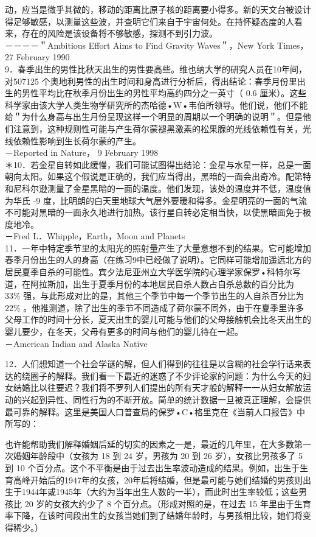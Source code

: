 动，应当是微乎其微的，移动的距离比原子核的距离要小得多。新的天文台被设计得足够敏感，以测量这些波，并查明它们来自于宇宙何处。在持怀疑态度的人看来，存在的风险是该设备将不够敏感，探测不到引力波。\\
－－－－＂Ambitious Effort Aims to Find Gravity Waves＂，New York Times， 27 February 1990\\
9．春季出生的男性比秋天出生的男性要高些。维也纳大学的研究人员在10年间，对507125 个奥地利男性的出生时间和身高进行分析后，得出结论：春季月份里出生的男性平均比在秋季月份出生的男性平均高约四分之一英寸（ 0.6 厘米）。这些科学家由该大学人类生物学研究所的杰哈德•W•韦伯所领导。他们说，他们不能给＂为什么身高与出生月份呈现这样一个明显的周期以一个明确的说明＂。但是他们注意到，这种规则性可能与产生荷尔蒙褪黑激素的松果腺的光线依赖性有关，光线依赖性影响到生长荷尔蒙的产生。\\
－Reported in Nature， 9 February 1998\\
＊10．若金星自转如此缓慢，我们可能试图得出结论：金星与水星一样，总是一面朝向太阳。如果这个假说是正确的，我们应当得出，黑暗的一面会出奇冷。配第特和尼科尔逊测量了金星黑暗的一面的温度。他们发现，该处的温度并不低，温度值为华氏 -9 度，比明朗的白天里地球大气层外要暖和得多。金星明亮的一面的气流不可能对黑暗的一面永久地进行加热。该行星自转必定相当快，以使黑暗面免于极度地冷。\\
－Fred L．Whipple，Earth，Moon and Planets\\
11．一年中特定季节里的太阳光的照射量产生了大量意想不到的结果。它可能增加春季月份出生的人的身高（在练习9中已经做了说明）。它同样可能增加遥远北方的居民夏季自杀的可能性。宾夕法尼亚州立大学医学院的心理学家保罗•科特尔写道，在阿拉斯加，出生于夏季月份的本地居民自杀人数占自杀总数的百分比为 $33 \%$ 强，与此形成对比的是，其他三个季节中每一个季节出生的人自杀百分比为 $22 \%$ 。他推测道，除了出生的季节不同造成了荷尔蒙不同外，由于在夏季里许多父母工作的时间十分长，夏天出生的婴儿可能与他们的父母接触机会比冬天出生的婴儿要少，在冬天，父母有更多的时间与他们的婴儿待在一起。\\
－American Indian and Alaska Native

12．人们想知道一个社会学谜的解，但人们得到的往往是以含糊的社会学行话来表达的绕圈子的解释。我们看一下最近的迷惑了不少评论家的问题：为什么今天的妇女结婚比以往要迟？我们将不罗列人们提出的所有天才般的解释一一从妇女解放运动的兴起到异性、同性行为的不断开放。简单的统计数据一旦被真正理解，会提供最可靠的解释。这里是美国人口普查局的保罗•C•格里克在《当前人口报告》中所写的：

\begin{displayquote}
也许能帮助我们解释婚姻后延的切实的因素之一是，最近的几年里，在大多数第一次婚姻年龄段中（女孩为 18 到 24 岁，男孩为 20 到 26 岁），女孩比男孩多了 5 到 10 个百分点。这个不平衡是由于过去出生率波动造成的结果。例如，出生于生育高峰开始后的1947年的女孩，20年后将结婚，但是最可能与她们结婚的男孩则出生于1944年或1945年（大约为当年出生人数的一半），而此时出生率较低；这些男孩比 20 岁的女孩大约少了 8 个百分点。（形成对照的是，在过去 15 年里由于生育率下降，在该时间段出生的女孩当她们到了结婚年龄时，与男孩相比较，她们将变得稀少。）
\end{displayquote}

